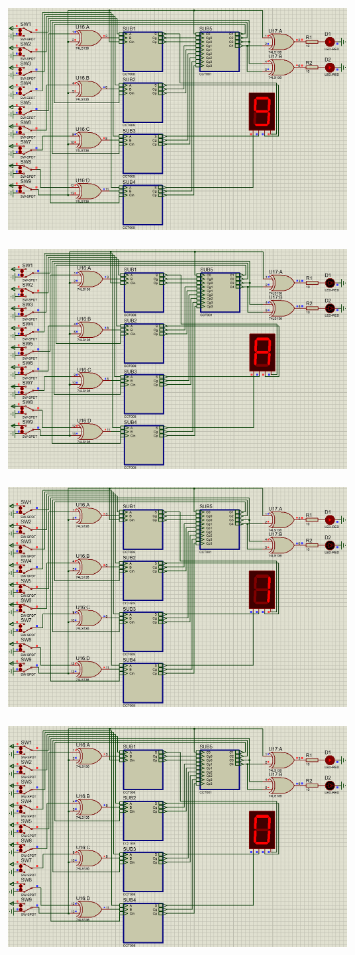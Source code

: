 \documentclass[UTF8, a4paper, 11pt]{article}
\begin{document}
\begin{figure}[H]
    \centering
    \includegraphics[width=0.8\textwidth]{4.png}
\end{figure}
\begin{figure}[H]
    \centering
    \includegraphics[width=0.8\textwidth]{5.png}
\end{figure}
\begin{figure}[H]
    \centering
    \includegraphics[width=0.8\textwidth]{6.png}
\end{figure}
\begin{figure}[H]
    \centering
    \includegraphics[width=0.8\textwidth]{7.png}
\end{figure}
\end{document}
